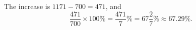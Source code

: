 The increase is $1171-700=471$, and
\[\dfrac{471}{700}\times100\%=\dfrac{471}{7}\%=\boxed{67\dfrac27\%}\approx67.29\%.\]
